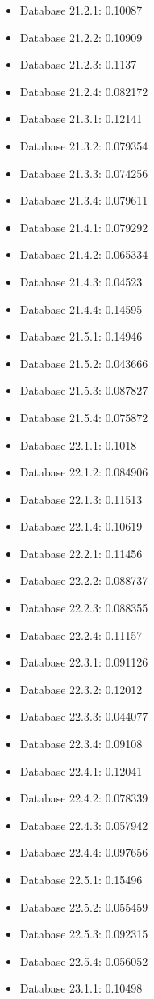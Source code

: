 \begin{itemize}
\item Database 21.2.1: 0.10087
\item Database 21.2.2: 0.10909
\item Database 21.2.3: 0.1137
\item Database 21.2.4: 0.082172
\item Database 21.3.1: 0.12141
\item Database 21.3.2: 0.079354
\item Database 21.3.3: 0.074256
\item Database 21.3.4: 0.079611
\item Database 21.4.1: 0.079292
\item Database 21.4.2: 0.065334
\item Database 21.4.3: 0.04523
\item Database 21.4.4: 0.14595
\item Database 21.5.1: 0.14946
\item Database 21.5.2: 0.043666
\item Database 21.5.3: 0.087827
\item Database 21.5.4: 0.075872
\item Database 22.1.1: 0.1018
\item Database 22.1.2: 0.084906
\item Database 22.1.3: 0.11513
\item Database 22.1.4: 0.10619
\item Database 22.2.1: 0.11456
\item Database 22.2.2: 0.088737
\item Database 22.2.3: 0.088355
\item Database 22.2.4: 0.11157
\item Database 22.3.1: 0.091126
\item Database 22.3.2: 0.12012
\item Database 22.3.3: 0.044077
\item Database 22.3.4: 0.09108
\item Database 22.4.1: 0.12041
\item Database 22.4.2: 0.078339
\item Database 22.4.3: 0.057942
\item Database 22.4.4: 0.097656
\item Database 22.5.1: 0.15496
\item Database 22.5.2: 0.055459
\item Database 22.5.3: 0.092315
\item Database 22.5.4: 0.056052
\item Database 23.1.1: 0.10498

\end{itemize}
